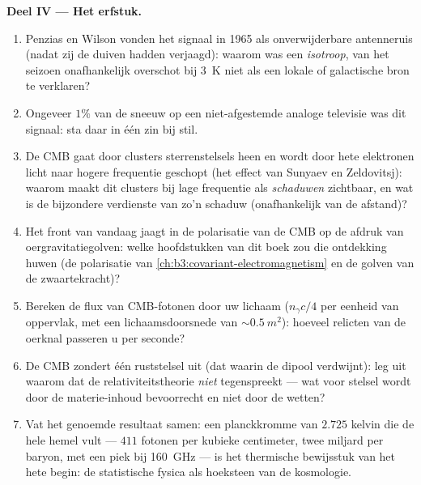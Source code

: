 \begin{problem}
\medskip\noindent\textbf{Deel IV --- Het erfstuk.}
\begin{enumerate}[resume]
  \item Penzias en Wilson vonden het signaal in 1965 als onverwijderbare
        antenneruis (nadat zij de duiven hadden verjaagd): waarom was een
        \emph{isotroop}, van het seizoen onafhankelijk overschot bij
        \qty{3}{K} niet als een lokale of galactische bron te verklaren?
  \item Ongeveer $1\%$ van de sneeuw op een niet-afgestemde analoge
        televisie was dit signaal: sta daar in één zin bij stil.
  \item De CMB gaat door clusters sterrenstelsels heen en wordt door hete
        elektronen licht naar hogere frequentie geschopt (het effect van
        Sunyaev en Zeldovitsj): waarom maakt dit clusters bij lage
        frequentie als \emph{schaduwen} zichtbaar, en wat is de bijzondere
        verdienste van zo'n schaduw (onafhankelijk van de afstand)?
  \item Het front van vandaag jaagt in de polarisatie van de CMB op de
        afdruk van oergravitatiegolven: welke hoofdstukken van dit boek
        zou die ontdekking huwen (de polarisatie van
        \cref{ch:b3:covariant-electromagnetism} en de golven van de
        zwaartekracht)?
  \item Bereken de flux van CMB-fotonen door uw lichaam ($n_\gamma c/4$
        per eenheid van oppervlak, met een lichaamsdoorsnede van
        $\sim\qty{0.5}{m^2}$): hoeveel relicten van de oerknal passeren u
        per seconde?
  \item De CMB zondert één ruststelsel uit (dat waarin de dipool
        verdwijnt): leg uit waarom dat de relativiteitstheorie
        \emph{niet} tegenspreekt --- wat voor stelsel wordt door de
        materie-inhoud bevoorrecht en niet door de wetten?
  \item Vat het genoemde resultaat samen: een planckkromme van
        $2.725$ kelvin die de hele hemel vult --- $411$ fotonen per
        kubieke centimeter, twee miljard per baryon, met een piek bij
        \qty{160}{GHz} --- is het thermische bewijsstuk van het hete
        begin: de statistische fysica als hoeksteen van de kosmologie.
\end{enumerate}
\end{problem}
